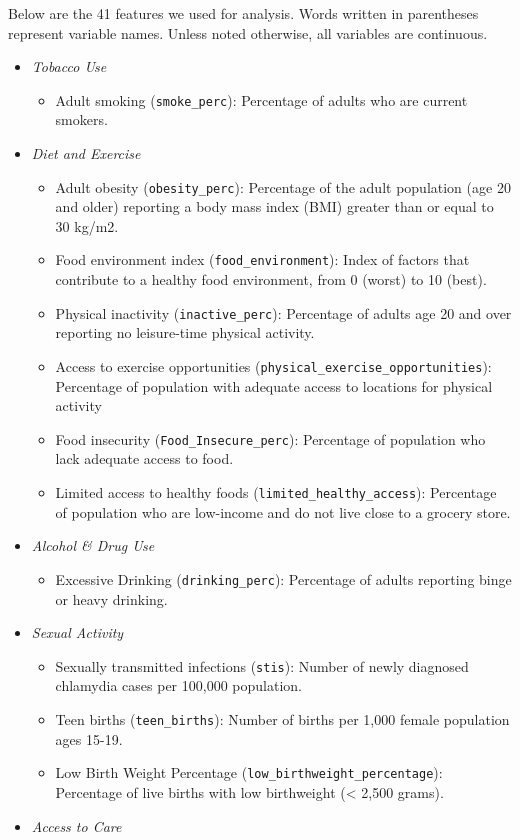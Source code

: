 \documentclass[
]{article}
\providecommand{\tightlist}{%
  \setlength{\itemsep}{0pt}\setlength{\parskip}{0pt}}
\begin{document}
Below are the 41 features we used for analysis. Words written in parentheses represent variable names. Unless noted otherwise, all variables are continuous.

\begin{itemize}
\tightlist
\item
  \emph{Tobacco Use}

  \begin{itemize}
  \tightlist
  \item
    Adult smoking (\texttt{smoke\_perc}): Percentage of adults who are current smokers.
  \end{itemize}
\item
  \emph{Diet and Exercise}

  \begin{itemize}
  \tightlist
  \item
    Adult obesity (\texttt{obesity\_perc}): Percentage of the adult population (age 20 and older) reporting a body mass index (BMI) greater than or equal to 30 kg/m2.
  \item
    Food environment index (\texttt{food\_environment}): Index of factors that contribute to a healthy food environment, from 0 (worst) to 10 (best).
  \item
    Physical inactivity (\texttt{inactive\_perc}): Percentage of adults age 20 and over reporting no leisure-time physical activity.
  \item
    Access to exercise opportunities (\texttt{physical\_exercise\_opportunities}): Percentage of population with adequate access to locations for physical activity
  \item
    Food insecurity (\texttt{Food\_Insecure\_perc}): Percentage of population who lack adequate access to food.
  \item
    Limited access to healthy foods (\texttt{limited\_healthy\_access}): Percentage of population who are low-income and do not live close to a grocery store.
  \end{itemize}
\item
  \emph{Alcohol \& Drug Use}

  \begin{itemize}
  \tightlist
  \item
    Excessive Drinking (\texttt{drinking\_perc}): Percentage of adults reporting binge or heavy drinking.
  \end{itemize}
\item
  \emph{Sexual Activity}

  \begin{itemize}
  \tightlist
  \item
    Sexually transmitted infections (\texttt{stis}): Number of newly diagnosed chlamydia cases per 100,000 population.
  \item
    Teen births (\texttt{teen\_births}): Number of births per 1,000 female population ages 15-19.
  \item
    Low Birth Weight Percentage (\texttt{low\_birthweight\_percentage}): Percentage of live births with low birthweight (\textless{} 2,500 grams).
  \end{itemize}
\item
  \emph{Access to Care}


\end{itemize}
\end{document}
